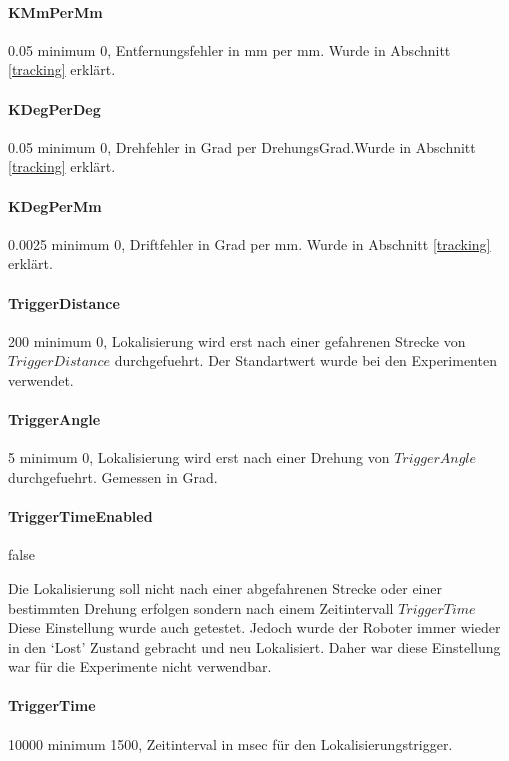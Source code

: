 \documentclass{article}
\begin{document}
\paragraph{KMmPerMm} 0.05             minimum 0,  Entfernungsfehler in mm per mm. Wurde in Abschnitt \ref{tracking} erkl\"art.

\paragraph{KDegPerDeg}\label{KDegPerDegDoc} 0.05           minimum 0,  Drehfehler in Grad per DrehungsGrad.Wurde in Abschnitt \ref{tracking} erkl\"art.
\paragraph{KDegPerMm} 0.0025          minimum 0, Driftfehler in Grad per mm.
Wurde in Abschnitt \ref{tracking} erkl\"art.

\paragraph{TriggerDistance} 200       minimum 0,  Lokalisierung wird erst nach einer gefahrenen Strecke von $TriggerDistance$ durchgefuehrt. Der Standartwert wurde bei den Experimenten verwendet.

\paragraph{TriggerAngle} 5            minimum 0,  Lokalisierung wird erst nach einer Drehung  von $TriggerAngle$ durchgefuehrt. Gemessen in Grad.

\paragraph{TriggerTimeEnabled} false  

Die Lokalisierung soll nicht nach einer abgefahrenen Strecke oder einer bestimmten Drehung erfolgen sondern nach einem Zeitintervall $TriggerTime$
Diese Einstellung wurde auch getestet. Jedoch wurde der Roboter immer wieder in den `Lost' Zustand gebracht und neu Lokalisiert. Daher war diese Einstellung war f\"ur die Experimente nicht verwendbar.

\paragraph{TriggerTime} 10000         minimum 1500,  Zeitinterval in msec f\"ur den Lokalisierungstrigger.
\end{document}
